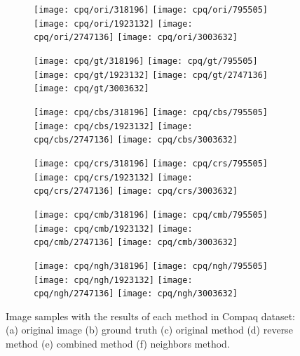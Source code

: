 \begin{figure}[!htb]
    \centering
    \begin{subfigure}[t]{0.15\textwidth}
        \texttt{[image: cpq/ori/318196]}
        \texttt{[image: cpq/ori/795505]}
        \texttt{[image: cpq/ori/1923132]}
        \texttt{[image: cpq/ori/2747136]}
        \texttt{[image: cpq/ori/3003632]}
        \caption{}
    \end{subfigure}
    \begin{subfigure}[t]{0.15\textwidth}
        \texttt{[image: cpq/gt/318196]}
        \texttt{[image: cpq/gt/795505]}
        \texttt{[image: cpq/gt/1923132]}
        \texttt{[image: cpq/gt/2747136]}
        \texttt{[image: cpq/gt/3003632]}
        \caption{}
    \end{subfigure}
    \begin{subfigure}[t]{0.15\textwidth}
        \texttt{[image: cpq/cbs/318196]}
        \texttt{[image: cpq/cbs/795505]}
        \texttt{[image: cpq/cbs/1923132]}
        \texttt{[image: cpq/cbs/2747136]}
        \texttt{[image: cpq/cbs/3003632]}
        \caption{}
    \end{subfigure}
    \begin{subfigure}[t]{0.15\textwidth}
        \texttt{[image: cpq/crs/318196]}
        \texttt{[image: cpq/crs/795505]}
        \texttt{[image: cpq/crs/1923132]}
        \texttt{[image: cpq/crs/2747136]}
        \texttt{[image: cpq/crs/3003632]}
        \caption{}
    \end{subfigure}
    \begin{subfigure}[t]{0.15\textwidth}
        \texttt{[image: cpq/cmb/318196]}
        \texttt{[image: cpq/cmb/795505]}
        \texttt{[image: cpq/cmb/1923132]}
        \texttt{[image: cpq/cmb/2747136]}
        \texttt{[image: cpq/cmb/3003632]}
        \caption{}
    \end{subfigure}
    \begin{subfigure}[t]{0.15\textwidth}
        \texttt{[image: cpq/ngh/318196]}
        \texttt{[image: cpq/ngh/795505]}
        \texttt{[image: cpq/ngh/1923132]}
        \texttt{[image: cpq/ngh/2747136]}
        \texttt{[image: cpq/ngh/3003632]}
        \caption{}
    \end{subfigure}

    \caption[Image samples with the results of each method in Compaq dataset]{Image samples with the results of each method in Compaq dataset: (a) original image (b) ground truth (c) original method \cite{brancati:17} (d) reverse method (e) combined method (f) neighbors method.}
    \label{fig:results_cpq}
\end{figure}


